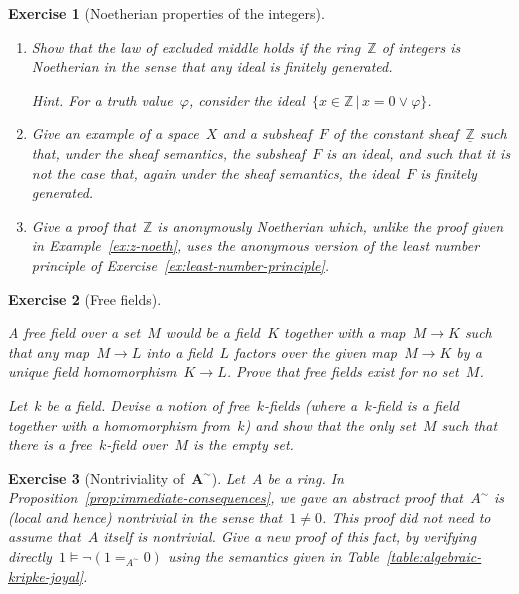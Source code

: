 \documentclass{ws-rv9x6}
\newtheorem{ex}{Exercise}
\newenvironment{exercise}[1]{
  \begin{ex}[#1]
}{\end{ex}}
\newcommand{\ZZ}{\mathbb{Z}}
\renewcommand{\_}{\mathpunct{.}}
\newcommand{\?}{\,{:}\,}
\begin{document}
\begin{exercise}{Noetherian properties of the integers}%
\begin{enumerate}
\item Show that the law of excluded middle holds if the ring~$\ZZ$ of integers
is Noetherian in the sense that any ideal is finitely generated.\smallskip

{\scriptsize\emph{Hint.} For a truth value~$\varphi$, consider the ideal~$\{ x
\in \ZZ \,|\, x = 0 \vee \varphi \}$.\par}
\item Give an example of a space~$X$ and a subsheaf~$F$ of the constant
sheaf~$\underline{\ZZ}$ such that, under the sheaf semantics, the subsheaf~$F$
is an ideal, and such that it is not the case that, again under the sheaf
semantics, the ideal~$F$ is finitely generated.
\item Give a proof that~$\ZZ$ is anonymously Noetherian which, unlike the proof
given in Example~\ref{ex:z-noeth}, uses the anonymous version of the least
number principle of Exercise~\ref{ex:least-number-principle}.
\end{enumerate}
\end{exercise}

\begin{exercise}{Free fields}
\begin{alphlist}[(b)]
\item A \emph{free field} over a set~$M$ would be
a field~$K$ together with a map~$M \to K$ such that any map~$M \to L$ into a
field~$L$ factors
over the given map~$M \to K$ by a unique field homomorphism~$K \to L$. Prove
that free fields exist for no set~$M$.
\item Let~$k$ be a field. Devise a notion of
\emph{free~$k$-fields} (where a~$k$-field is a field together with a
homomorphism from~$k$) and show that the only set~$M$ such that there is a
free~$k$-field over~$M$ is the empty set.
\end{alphlist}
\end{exercise}

\begin{exercise}{Nontriviality of~$\boldsymbol{A^\sim}$}%
Let~$A$ be a ring. In Proposition~\ref{prop:immediate-consequences}, we gave an
abstract proof that~$A^\sim$ is (local and hence) nontrivial in the sense that~$1
\neq 0$. This proof did not need to assume that~$A$ itself is nontrivial. Give a new proof of this
fact, by verifying directly~$1 \models \neg(1 =_{A^\sim} 0)$ using the
semantics given in Table~\ref{table:algebraic-kripke-joyal}.
\end{exercise}
\end{document}
